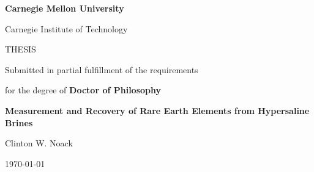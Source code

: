 
\thispagestyle{empty}
\begin{center}
\Huge{\textbf{Carnegie Mellon University}}

\LARGE{Carnegie Institute of Technology}
\vspace{1cm}

\Large{THESIS}

Submitted in partial fulfillment of the requirements

for the degree of \large{\textbf{Doctor of Philosophy}}

\vspace{1cm}

\Large{\textbf{Measurement and Recovery of Rare Earth Elements from Hypersaline Brines}}

\Large{Clinton W. Noack}




\large{\today}
\end{center}

\clearpage
 
